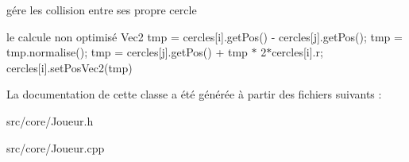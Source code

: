 gére les collision entre ses propre cercle 

le calcule non optimisé Vec2 tmp = cercles\mbox{[}i\mbox{]}.get\+Pos() -\/ cercles\mbox{[}j\mbox{]}.get\+Pos(); tmp = tmp.\+normalise(); tmp = cercles\mbox{[}j\mbox{]}.get\+Pos() + tmp $\ast$ 2$\ast$cercles\mbox{[}i\mbox{]}.r; cercles\mbox{[}i\mbox{]}.set\+Pos\+Vec2(tmp) 

La documentation de cette classe a été générée à partir des fichiers suivants \+:\begin{DoxyCompactItemize}
\item 
src/core/Joueur.\+h\item 
src/core/Joueur.\+cpp\end{DoxyCompactItemize}
